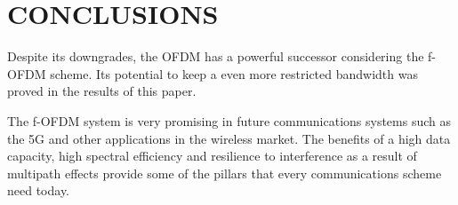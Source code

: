 \section{CONCLUSIONS}

Despite its downgrades, the OFDM has a powerful successor considering the f-OFDM scheme. Its potential to keep a even more restricted bandwidth was proved in the results of this paper.

The f-OFDM system is very promising in future communications systems such as the 5G and other applications in the wireless market. The benefits of a high data capacity, high spectral efficiency and resilience to interference as a result of multipath effects provide some of the pillars that every communications scheme need today.